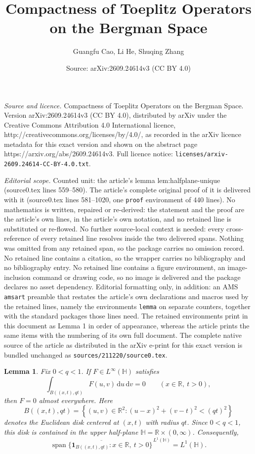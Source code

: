 \documentclass[10pt,a4paper]{amsart}
\title{Compactness of Toeplitz Operators on the Bergman Space}
\author{Guangfu Cao, Li He, Shuqing Zhang}
\date{Source: arXiv:2609.24614v3 (CC BY 4.0)}
\newtheorem{lemma}{Lemma}
\DeclareMathOperator{\Span}{span}
\newcommand{\dd}{\,\mathrm d}
\begin{document}
\maketitle

\noindent\emph{Source and licence.} Compactness of Toeplitz Operators on the Bergman Space. Version arXiv:2609.24614v3 (CC BY 4.0), distributed by arXiv under the Creative Commons Attribution 4.0 International licence, http://creativecommons.org/licenses/by/4.0/, as recorded in the arXiv licence metadata for this exact version and shown on the abstract page https://arxiv.org/abs/2609.24614v3. Full licence notice: \texttt{licenses/arxiv-2609.24614-CC-BY-4.0.txt}.\par\smallskip

\noindent\textit{Editorial scope.} Counted unit: the article's lemma lem:halfplane-unique (source0.tex lines 559--580). The article's complete original proof of it is delivered with it (source0.tex lines 581--1020, one \texttt{proof} environment of 440 lines). No mathematics is written, repaired or re-derived: the statement and the proof are the article's own lines, in the article's own notation, and no retained line is substituted or re-flowed.  No further source-local context is needed: every cross-reference of every retained line resolves inside the two delivered spans.  Nothing was omitted from any retained span, so the package carries no omission record.  No retained line contains a citation, so the wrapper carries no bibliography and no bibliography entry.  No retained line contains a figure environment, an image-inclusion command or drawing code, so no image is delivered and the package declares no asset dependency.  Editorial formatting only, in addition: an AMS \texttt{amsart} preamble that restates the article's own declarations and macros used by the retained lines, namely the environments \texttt{lemma} on separate counters, together with the standard packages those lines need.  The retained environments print in this document as Lemma 1 in order of appearance, whereas the article prints the same items with the numbering of its own full document.  The complete native source of the article as distributed in the arXiv e-print for this exact version is bundled unchanged as \texttt{sources/211220/source0.tex}.
\begin{lemma}\label{lem:halfplane-unique}
Fix $0<q<1$. If $F\in L^\infty(\mathbb H)$ satisfies
\begin{equation}\label{eq:halfplane-zero}
\int_{B((x,t),qt)}F(u,v)\dd u\dd v=0
\qquad(x\in\mathbb R,\ t>0),
\end{equation}
then $F=0$ almost everywhere. Here
\[
B((x,t),qt)
=
\left\{(u,v)\in\mathbb{R}^2:
(u-x)^2+(v-t)^2<(qt)^2
\right\}
\]
denotes the Euclidean disk centered at $(x,t)$ with radius $qt$.
Since $0<q<1$, this disk is contained in the upper half-plane
$\mathbb H=\mathbb R\times(0,\infty)$. Consequently,
\begin{equation}\label{eq:halfplane-dense}
\overline{\Span\{\mathbf1_{B((x,t),qt)}:x\in\mathbb R,\ t>0\}}^{\,L^1(\mathbb H)}
=L^1(\mathbb H).
\end{equation}
\end{lemma}
\end{document}
